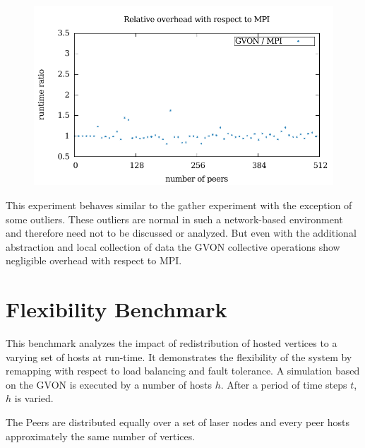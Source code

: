 \begin{figure}[H]
\begin{minipage}[t]{0.5\textwidth}
    \includegraphics[width=\textwidth]{plots/50_reduce_network_overhead_gvon_laser}
  \end{minipage}%
  \caption{ }
  \label{fig:reduce_laser}
\end{figure}

\noindent This experiment behaves similar to the gather experiment
with the exception of some outliers. These outliers are normal in such
a network-based environment and therefore need not to be discussed or
analyzed. But even with the additional abstraction and local
collection of data the GVON collective operations show negligible
overhead with respect to MPI.


\section{Flexibility Benchmark}

This benchmark analyzes the impact of redistribution of hosted
vertices to a varying set of hosts at run-time. It demonstrates the
flexibility of the system by remapping with respect to load balancing
and fault tolerance.  A simulation based on the GVON is executed by a
number of hosts $h$. After a period of time steps $t$, $h$ is varied.

The Peers are distributed equally over a set of laser nodes and
every peer hosts approximately the same number of vertices.

